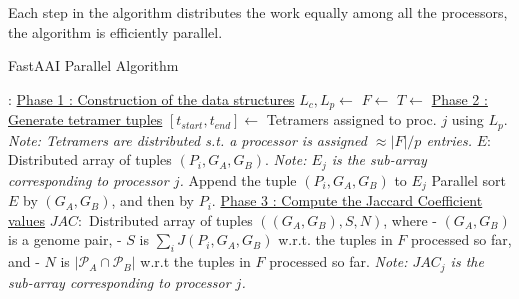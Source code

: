 \documentclass{article}[11pt]
\begin{document}
Each step in the algorithm distributes the work equally among all the processors, the algorithm is efficiently parallel.
\begin{algorithm}[H]
\caption{FastAAI Parallel Algorithm}
\label{alg:fastAAIParallelTetramer}
\begin{algorithmic}[1]
    :
        \Statex \underline{Phase 1 : Construction of the data structures}
        \State \label{constructBeginTetramer} $L_c, L_p \gets$ 
        \State $F \gets $ 
        \State \label{constructEndTetramer}  $T \gets $ 
        \Statex \underline{Phase 2 : Generate tetramer tuples}
        \State $[t_{start}, t_{end}] \gets$ Tetramers assigned to proc. $j$ using $L_p$.
        \Statex \; \; \; \textit{Note: Tetramers are distributed s.t. a processor is assigned  $\approx |F|/p$ entries.}
        \State \label{ebeginTetramer} $E : $ Distributed array of tuples $(P_i, G_A, G_B)$.
        \Statex \; \; \; \textit{Note: $E_j$ is the sub-array corresponding to processor $j$.}
                  \State Append the tuple $(P_i, G_A, G_B)$ to $E_j$
              \EndFor
           \EndFor
        \EndFor
        \State \label{eendTetramer} Parallel sort $E$ by $(G_A, G_B)$, and then by $P_i$. 
        \Statex \underline{Phase 3 : Compute the Jaccard Coefficient values} 
        \State \label{jacbeginTetramer} $JAC :$  Distributed array  of tuples $((G_A, G_B), S, N)$, where 
        \Statex \; \; \; \; - $(G_A, G_B)$ is a genome pair, 
        \Statex \; \; \; \; - $S$ is $\sum_i J(P_i, G_A, G_B)$ w.r.t. the tuples in $F$ processed so far, and
        \Statex \; \; \; \; - $N$ is $|\mathcal{P}_A \cap \mathcal{P}_B|$ w.r.t the tuples in $F$ processed so far.
        \Statex \; \; \; \; \textit{Note: $JAC_j$ is the sub-array corresponding to processor $j$.}

\end{algorithmic}
\end{algorithm}
\end{document}
